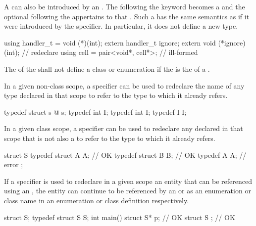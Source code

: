 \pnum
A  can also be introduced by an
. The  following the
 keyword becomes a 
and the optional  following the
 appertains to that .
Such a  has the same
semantics as if it were introduced by the  specifier. In
particular, it does not define a new type.
\begin{example}

\begin{codeblock}
using handler_t = void (*)(int);
extern handler_t ignore;
extern void (*ignore)(int);         // redeclare 
using cell = pair<void*, cell*>;    // ill-formed
\end{codeblock}

\end{example}
The 
of the  shall not define
a class or enumeration if the 
is the  of a .

\pnum
{}%
In a given non-class scope, a  specifier can be used to
redeclare the name of any type declared in that scope to refer to the
type to which it already refers.
\begin{example}

\begin{codeblock}
typedef struct s { @\commentellip@ } s;
typedef int I;
typedef int I;
typedef I I;
\end{codeblock}
\end{example}

\pnum
In a given class scope, a  specifier can be used to
redeclare any  declared in that scope that is not
also a  to refer to the type to which it already
refers.
\begin{example}

\begin{codeblock}
struct S {
  typedef struct A { } A;       // OK
  typedef struct B B;           // OK
  typedef A A;                  // error
};
\end{codeblock}
\end{example}

\pnum
If a  specifier is used to redeclare in a given scope an
entity that can be referenced using an ,
the entity can continue to be referenced by an
 or as an enumeration or class name
in an enumeration or class definition respectively. \begin{example}
\begin{codeblock}
struct S;
typedef struct S S;
int main() {
  struct S* p;                  // OK
}
struct S { };                   // OK
\end{codeblock}
\end{example}


